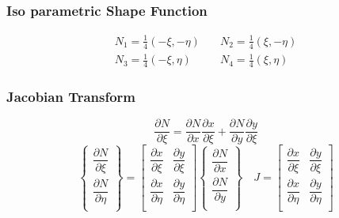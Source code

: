 \documentclass[9pt]{beamer}
\begin{document}
\begin{frame}
\frametitle{Iso parametric Shape Function}
\begin{figure}[h!]
\centering

\end{figure}
\begin{equation*}
\begin{split}
N_1  =\frac{1}{4}\left(-\xi , -\eta \right)\quad  & N_2=\frac{1}{4}\left(\xi , -\eta \right) \\
 N_3  =\frac{1}{4}\left(-\xi , \eta \right)\quad  & N_4 =\frac{1}{4}\left(\xi , \eta \right)
\end{split}
\end{equation*}


\end{frame}
\begin{frame}
\frametitle{Jacobian Transform}
\begin{equation*}
\dfrac{\partial N }{ \partial \xi } = 
\dfrac{\partial N }{ \partial x }
\dfrac{ \partial x }{\partial \xi }  
+
\dfrac{\partial N }{ \partial y }
\dfrac{ \partial y }{\partial \xi } 
\end{equation*}
\begin{equation}
\left\{
\begin{array}{r}
\dfrac{\partial N }{ \partial \xi }  \\
\dfrac{\partial N }{ \partial \eta }  \\
\end{array}
\right\}
=
\begin{bmatrix}
\dfrac{ \partial x }{\partial \xi }   &
\dfrac{ \partial y }{\partial \xi } \\
\dfrac{ \partial x }{\partial \eta }   &
\dfrac{ \partial y }{\partial \eta } \\
\end{bmatrix}
\left\{
\begin{array}{r}
\dfrac{\partial N }{ \partial x }  \\
\dfrac{\partial N }{ \partial y }  \\
\end{array}
\right\}
\quad
J=\begin{bmatrix}
\dfrac{ \partial x }{\partial \xi }   &
\dfrac{ \partial y }{\partial \xi } \\
\dfrac{ \partial x }{\partial \eta }   &
\dfrac{ \partial y }{\partial \eta } \\
\end{bmatrix}
\end{equation}


\end{frame}
\end{document}
